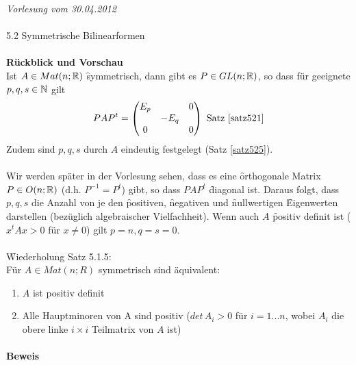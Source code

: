 \newpage
\noindent \textit{Vorlesung vom 30.04.2012} \\\\
\Large{5.2 Symmetrische Bilinearformen} \normalsize \\\\
\textbf{Rückblick und Vorschau} \\
Ist $A \in Mat(n; \mathbb{R})$ \f{symmetrisch}, dann gibt es $P \in GL(n; \mathbb{R})$, so dass für geeignete $p, q, s \in \mathbb{N}$ gilt
\begin{align}
PAP^t = \begin{pmatrix} E_p & & 0 \\ & - E_q & \\ 0 & & 0\end{pmatrix} \text{ Satz \ref{satz521}}
\end{align}
Zudem sind $p, q, s$ durch $A$ eindeutig festgelegt (Satz \ref{satz525}). \\\\
Wir werden später in der Vorlesung sehen, dass es eine \f{orthogonale} Matrix $P \in O(n; \mathbb{R})$ (d.h. $P^{-1} = P^t$) gibt, so dass $PAP^t$ \f{diagonal} ist.
Daraus folgt, dass $p, q, s$ die Anzahl von je den \f{positiven}, \f{negativen} und \f{nullwertigen} \f{Eigenwerten} darstellen (bezüglich algebraischer Vielfachheit). Wenn auch $A$ \f{positiv definit} ist ($x^t Ax > 0$ für $x \neq 0$) gilt $p=n, q=s=0$.\\\\
\f{Wiederholung Satz 5.1.5:} \\ %
Für $A \in Mat(n; R)$ symmetrisch sind äquivalent:
\begin{enumerate}
\item $A$ ist positiv definit
\item Alle Hauptminoren von A sind positiv ($det\,A_i > 0$ für $i = 1...n$, wobei $A_i$ die obere linke $i \times i$ Teilmatrix von $A$ ist)
\end{enumerate}
\paragraph{Beweis}

